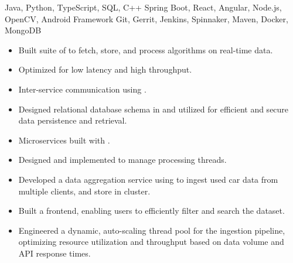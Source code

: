  Java, Python, TypeScript, SQL, C++\newline
{} Spring Boot, React, Angular, Node.js, OpenCV, Android Framework\newline
{} Git, Gerrit, Jenkins, Spinnaker, Maven, Docker, MongoDB\newline


\begin{itemize}
  \item Built  suite of  to fetch, store, and process algorithms on real-time  data.
  \item Optimized for low latency and high throughput.
  \item Inter-service communication using .
  \item Designed relational database schema in  and utilized  for efficient and secure data persistence and retrieval.
  \item Microservices built with .
  \item Designed and implemented  to manage processing threads.
 \end{itemize}

\begin{itemize}
    \item Developed a data aggregation service using  to ingest used car data from multiple clients, and store in  cluster.
    \item Built a  frontend, enabling users to efficiently filter and search the dataset.
    \item Engineered a dynamic, auto-scaling thread pool for the ingestion pipeline, optimizing resource utilization and throughput based on data volume and API response times.
 \end{itemize}
 
